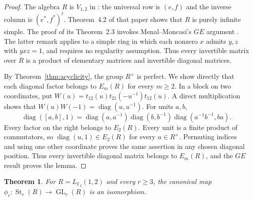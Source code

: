 \documentclass[11pt]{amsart}
\newcommand{\F}{\mathbb F}
\DeclareMathOperator{\GL}{GL}
\DeclareMathOperator{\St}{St}
\newtheorem{theorem}{Theorem}[section]
\theoremstyle{definition}
\theoremstyle{remark}
\numberwithin{equation}{section}
\begin{document}
\begin{proof}
The algebra $R$ is $V_{1,2}$ in \cite[\S4]{AGP02}: the universal row is $(e,f)$ and the inverse column is $(e^*,f^*)^t$. Theorem~4.2 of that paper shows that $R$ is purely infinite simple. The proof of its Theorem~2.3 invokes Menal--Moncasi's $GE$ argument \cite[Theorem~2.2 and the remark after Corollary~2.3]{MM84}. The latter remark applies to a simple ring in which each nonzero $x$ admits $y,z$ with $yxz=1$, and requires no regularity assumption. Thus every invertible matrix over $R$ is a product of elementary matrices and invertible diagonal matrices.

By Theorem~\ref{thm:acyclicity}, the group $R^\times$ is perfect. We show directly that each diagonal factor belongs to $E_m(R)$ for every $m\geq2$. In a block on two coordinates, put $W(u)=t_{12}(u)t_{21}(-u^{-1})t_{12}(u)$. A direct multiplication shows that $W(u)W(-1)=\operatorname{diag}(u,u^{-1})$. For units $a,b$,
$$
\operatorname{diag}([a,b],1) =\operatorname{diag}(a,a^{-1}) \operatorname{diag}(b,b^{-1}) \operatorname{diag}(a^{-1}b^{-1},ba).
$$
Every factor on the right belongs to $E_2(R)$. Every unit is a finite product of commutators, so $\operatorname{diag}(u,1)\in E_2(R)$ for every $u\in R^\times$. Permuting indices and using one other coordinate proves the same assertion in any chosen diagonal position. Thus every invertible diagonal matrix belongs to $E_m(R)$, and the $GE$ result proves the lemma.
\end{proof}

\begin{theorem}
\label{thm:steinberg-isomorphism}
For $R=L_{\F_2}(1,2)$ and every $r\geq3$, the canonical map $\phi_r:\St_r(R)\to\GL_r(R)$ is an isomorphism.
\end{theorem}
\end{document}
